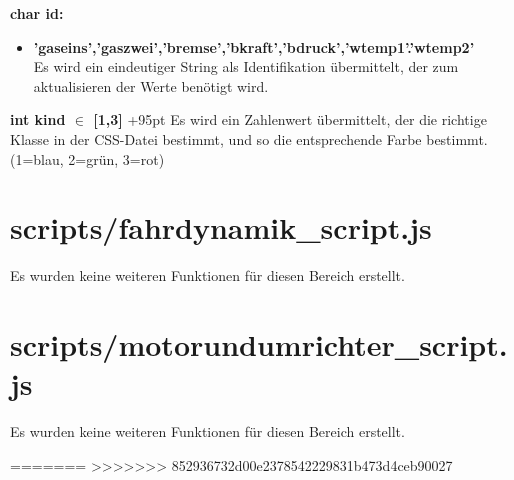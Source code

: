\documentclass[fontsize = 12pt, paper = a4]{scrreprt}
\begin{document}
\textbf{char id:}
\begin{itemize}
\item \textbf{'gaseins','gaszwei','bremse','bkraft','bdruck','wtemp1'.'wtemp2'}\\
Es wird ein eindeutiger String als Identifikation übermittelt, der zum aktualisieren der Werte benötigt wird.\\
\end{itemize}


\textbf{int kind $\in$ [1,3]}
\hangindent+95pt 
Es wird ein Zahlenwert übermittelt, der die richtige Klasse in der CSS-Datei bestimmt, und so die entsprechende Farbe bestimmt. (1=blau, 2=grün, 3=rot)\\





\section{scripts/fahrdynamik\_script.js}
Es wurden keine weiteren Funktionen für diesen Bereich erstellt.




\section{scripts/motorundumrichter\_script.js}
Es wurden keine weiteren Funktionen für diesen Bereich erstellt.



  








=======
>>>>>>> 852936732d00e2378542229831b473d4ceb90027


\listoffigures

%


\appendix
{} 

\end{document}
